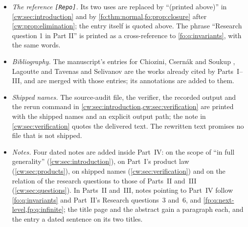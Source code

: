\documentclass[11pt,letterpaper]{article}
\numberwithin{equation}{section}
\theoremstyle{definition}
\theoremstyle{remark}
\theoremstyle{definition}
\newcommand{\Tw}{\mathsf K}
\begin{document}
\begin{itemize}
is printed $\Tw_k$, as in Part~II (\cref{fo:sec:notation}), since Part~I's
$K_k$ is a different space. Its unused height macro and its macro for the
pinned commit are dropped. No normalization is changed. The notation table is
\cref{cw:sec:notation}.
\item \emph{The reference \texttt{[Repo]}.} Its two uses are replaced by
``(printed above)'' in \cref{cw:sec:introduction} and by
\cref{fo:thm:normal,fo:prop:closure} after \cref{cw:prop:elimination}; the
entry itself is quoted above. The phrase ``Research question 1 in Part II''
is printed as a cross-reference to \cref{fo:q:invariants}, with the same
words.
\item \emph{Bibliography.} The manuscript's entries for Chiozini, Csern\'ak
and Soukup \cite{CCS}, Lagoutte and Tavenas \cite{LT} and Selivanov
\cite{Selivanov} are the works already cited by Parts~I--III, and are merged
with those entries; its annotations are added to them.
\item \emph{Shipped names.} The source-audit file, the verifier, the recorded
output and the rerun command in \cref{cw:sec:introduction,cw:sec:verification}
are printed with the shipped names and an explicit output path; the note in
\cref{cw:sec:verification} quotes the delivered text. The rewritten text
promises no file that is not shipped.
\item \emph{Notes.} Four dated notes are added inside Part~IV: on the scope
of ``in full generality'' (\cref{cw:sec:introduction}), on Part~I's product
law (\cref{cw:sec:products}), on shipped names (\cref{cw:sec:verification})
and on the relation of the research questions to those of Parts~II and~III
(\cref{cw:sec:questions}). In Parts~II and~III, notes pointing to Part~IV
follow \cref{fo:q:invariants} and Part~II's Research questions~3 and~6, and
\cref{fp:q:next-level,fp:q:infinite}; the title page and the abstract gain a
paragraph each, and the entry \cite{CCS} a dated sentence on its two titles.
\end{itemize}
\end{document}
